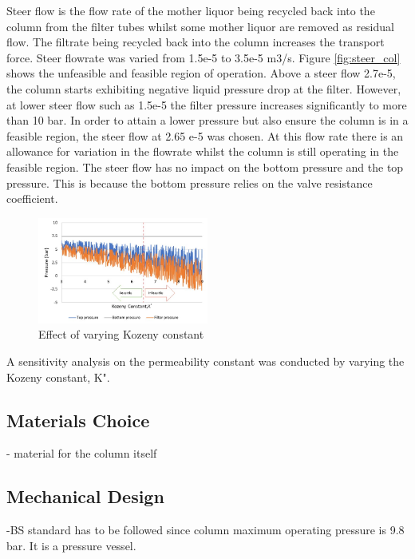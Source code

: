 Steer flow is the flow rate of the mother liquor being recycled back into the column from the filter tubes whilst some mother liquor are removed as residual flow. The filtrate being recycled back into the column increases the transport force. Steer flowrate was varied from 1.5e-5 to 3.5e-5 m3/s. Figure \ref{fig:steer_col} shows the unfeasible and feasible region of operation. Above a steer flow 2.7e-5, the column starts exhibiting negative liquid pressure drop at the filter. However, at lower steer flow such as 1.5e-5 the filter pressure increases significantly to more than 10 bar. In order to attain a lower pressure but also ensure the column is in a feasible region, the steer flow at 2.65 e-5 was chosen. At this flow rate there is an allowance for variation in the flowrate whilst the column is still operating in the feasible region. The steer flow has no impact on the bottom pressure and the top pressure. This is because the bottom pressure relies on the valve resistance coefficient. 

\begin{figure}
\centering
\includegraphics[width=0.5\textwidth]{chapters/3-separation/figures/kozeny.jpg}
\caption{ Effect of varying Kozeny constant}
\label{fig:koz_col}
\end{figure}

A sensitivity analysis on the permeability constant was conducted by varying the Kozeny constant, K". 


\subsection{Materials Choice}
- material for the column itself 

\subsection{Mechanical Design}
-BS standard has to be followed since column maximum operating pressure is 9.8 bar. It is a pressure vessel.  
